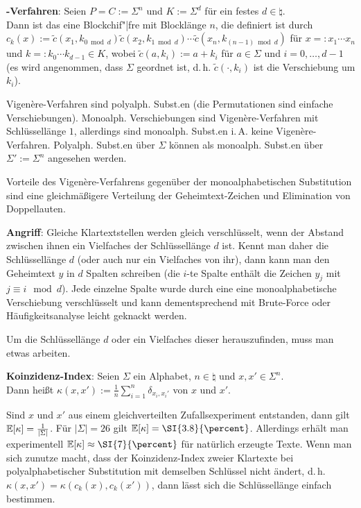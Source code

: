 \textbf{-Verfahren}:
Seien $P = C := \Sigma^n$ und $K := \Sigma^d$ für ein festes $d \in \natural$.\\
Dann ist das  eine
Blockchif"|fre mit Blocklänge $n$, die definiert ist durch
$c_k(x) := \widetilde{c}(x_1, k_{0 \bmod d}) \widetilde{c}(x_2, k_{1 \bmod d}) \cdots
\widetilde{c}(x_n, k_{(n-1) \bmod d})$ für $x =: x_1 \cdots x_n$ und
$k =: k_0 \dotsb k_{d-1} \in K$, wobei
$\widetilde{c}(a, k_i) := a + k_i$ für $a \in \Sigma$ und $i = 0, \dotsc, d - 1$\\
(es wird angenommen, dass $\Sigma$ geordnet ist, d.\,h.
$\widetilde{c}(\cdot, k_i)$ ist die Verschiebung um $k_i$).

Vigenère-Verfahren sind polyalph. Subst.en
(die Permutationen sind einfache Verschiebungen).
Monoalph. Verschiebungen sind Vigenère-Verfahren mit Schlüssellänge $1$,
allerdings sind monoalph. Subst.en i.\,A. keine Vigenère-Verfahren.
Polyalph. Subst.en über $\Sigma$ können als monoalph. Subst.en über
$\Sigma' := \Sigma^n$ angesehen werden.

Vorteile des Vigenère-Verfahrens gegenüber der monoalphabetischen Substitution sind
eine gleichmäßigere Verteilung der Geheimtext-Zeichen und Elimination von Doppellauten.

\textbf{Angriff}:
Gleiche Klartextstellen werden gleich verschlüsselt, wenn der Abstand zwischen ihnen ein Vielfaches
der Schlüssellänge $d$ ist.
Kennt man daher die Schlüssellänge $d$ (oder auch nur ein Vielfaches von ihr),
dann kann man den Geheimtext $y$ in $d$ Spalten schreiben
(die $i$-te Spalte enthält die Zeichen $y_j$ mit $j \equiv i \mod d$).
Jede einzelne Spalte wurde durch eine eine monoalphabetische Verschiebung verschlüsselt und kann
dementsprechend mit Brute-Force oder Häufigkeitsanalyse leicht geknackt werden.

\linie

Um die Schlüssellänge $d$ oder ein Vielfaches dieser herauszufinden, muss man etwas arbeiten.

\textbf{Koinzidenz-Index}:
Seien $\Sigma$ ein Alphabet, $n \in \natural$ und $x, x' \in \Sigma^n$.\\
Dann heißt $\kappa(x, x') := \frac{1}{n} \sum_{i=1}^n \delta_{x_i,x_i'}$
 von $x$ und $x'$.

Sind $x$ und $x'$ aus einem gleichverteilten Zufallsexperiment entstanden, dann gilt
$\mathbb{E}[\kappa] = \frac{1}{|\Sigma|}$.
Für $|\Sigma| = 26$ gilt $\EE[\kappa] = \SI{3.8}{\percent}$.
Allerdings erhält man experimentell $\EE[\kappa] \approx \SI{7}{\percent}$ für
natürlich erzeugte Texte.
Wenn man sich zunutze macht, dass der Koinzidenz-Index zweier Klartexte bei
polyalphabetischer Substitution mit demselben Schlüssel
nicht ändert, d.\,h. $\kappa(x, x') = \kappa(c_k(x), c_k(x'))$,
dann lässt sich die Schlüssellänge einfach bestimmen.

